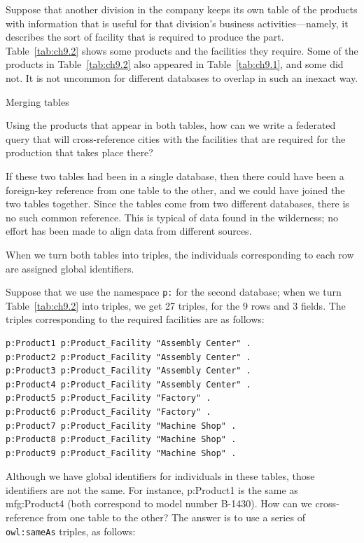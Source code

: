 Suppose that another division in the company keeps its own table of the
products with information that is useful for that division's business
activities---namely, it describes the sort of facility that is required
to produce the part. Table~\ref{tab:ch9.2} shows some products and the facilities
they require. Some of the products in Table~\ref{tab:ch9.2} also appeared in Table~\ref{tab:ch9.1}, and some did not. It is not uncommon for different databases to
overlap in such an inexact way.

\begin{challenge}{Merging tables}

Using the products that appear in both tables, how can we write a
federated query that will cross-reference cities with the facilities
that are required for the production that takes place there?

\solution

If these two tables had been in a single database, then there could have
been a foreign-key reference from one table to the other, and we could
have joined the two tables together. Since the tables come from two
different databases,
there is no such common reference. This is typical of data found in the
wilderness; no effort has been made to align data from different
sources.

When we turn both tables into triples, the individuals corresponding to
each row are assigned global identifiers.

Suppose that we use the namespace \texttt{p:} for the second database; when we
turn  Table~\ref{tab:ch9.2} into triples, we get 27 triples, for the 9 rows and 3
fields. The triples corresponding to the required facilities are as
follows:

\begin{lstlisting}
p:Product1 p:Product_Facility "Assembly Center" .
p:Product2 p:Product_Facility "Assembly Center" .
p:Product3 p:Product_Facility "Assembly Center" .
p:Product4 p:Product_Facility "Assembly Center" .
p:Product5 p:Product_Facility "Factory" .
p:Product6 p:Product_Facility "Factory" .
p:Product7 p:Product_Facility "Machine Shop" .
p:Product8 p:Product_Facility "Machine Shop" .
p:Product9 p:Product_Facility "Machine Shop" .
\end{lstlisting}

Although we have global identifiers for individuals in these tables,
those identifiers are not the same. For instance, p:Product1 is the same
as mfg:Product4 (both correspond to model number B-1430). How can we
cross-reference from one table to the other? The answer is to use a
series of \texttt{owl:sameAs} triples, as follows:


\end{challenge}
